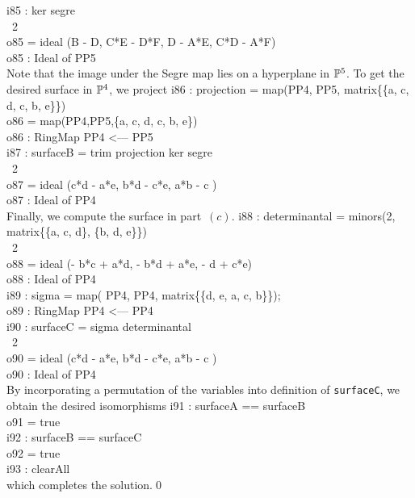 \begin{solution*}
\endOutput
\beginOutput
i85 : ker segre\\
\emptyLine
\                                2\\
o85 = ideal (B - D, C*E - D*F, D  - A*E, C*D - A*F)\\
\emptyLine
o85 : Ideal of PP5\\
\endOutput
Note that the image under the Segre map lies on a hyperplane in
${\mathbb P}^{5}$.  To get the desired surface in ${\mathbb P}^{4}$, we project
\beginOutput
i86 : projection = map(PP4, PP5, matrix\{\{a, c, d, c, b, e\}\})\\
\emptyLine
o86 = map(PP4,PP5,\{a, c, d, c, b, e\})\\
\emptyLine
o86 : RingMap PP4 <--- PP5\\
\endOutput
\beginOutput
i87 : surfaceB = trim projection ker segre\\
\emptyLine
\                                          2\\
o87 = ideal (c*d - a*e, b*d - c*e, a*b - c )\\
\emptyLine
o87 : Ideal of PP4\\
\endOutput
Finally, we compute the surface in part~$(c)$.
\beginOutput
i88 : determinantal = minors(2, matrix\{\{a, c, d\}, \{b, d, e\}\})\\
\emptyLine
\                                          2\\
o88 = ideal (- b*c + a*d, - b*d + a*e, - d  + c*e)\\
\emptyLine
o88 : Ideal of PP4\\
\endOutput
\beginOutput
i89 : sigma = map( PP4, PP4, matrix\{\{d, e, a, c, b\}\});\\
\emptyLine
o89 : RingMap PP4 <--- PP4\\
\endOutput
\beginOutput
i90 : surfaceC = sigma determinantal\\
\emptyLine
\                                          2\\
o90 = ideal (c*d - a*e, b*d - c*e, a*b - c )\\
\emptyLine
o90 : Ideal of PP4\\
\endOutput
By incorporating a permutation of the variables into definition of
{\tt surfaceC}, we obtain the desired isomorphisms
\beginOutput
i91 : surfaceA == surfaceB\\
\emptyLine
o91 = true\\
\endOutput
\beginOutput
i92 : surfaceB == surfaceC\\
\emptyLine
o92 = true\\
\endOutput
\beginOutput
i93 : clearAll\\
\endOutput
which completes the solution.\qed
\end{solution*}


